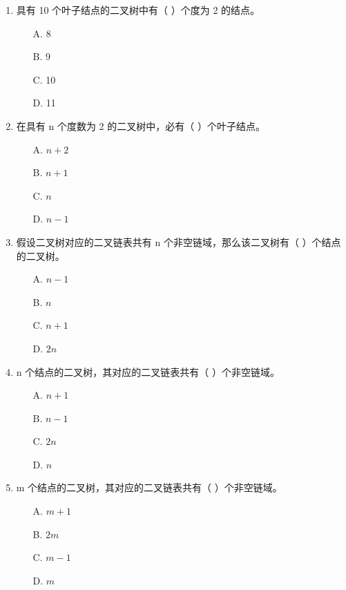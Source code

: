 \documentclass[12pt, a4paper]{article}
\begin{document}
\begin{enumerate}[label=\arabic*.]
	\item 具有 10 个叶子结点的二叉树中有（ ）个度为 2 的结点。
	      \begin{enumerate}
		      \item[A.] 8
		      \item[B.] 9
		      \item[C.] 10
		      \item[D.] 11
	      \end{enumerate}

	\item 在具有 n 个度数为 2 的二叉树中，必有（ ）个叶子结点。
	      \begin{enumerate}
		      \item[A.] $n+2$
		      \item[B.] $n+1$
		      \item[C.] $n$
		      \item[D.] $n-1$
	      \end{enumerate}

	\item 假设二叉树对应的二叉链表共有 n 个非空链域，那么该二叉树有（ ）个结点的二叉树。
	      \begin{enumerate}
		      \item[A.] $n-1$
		      \item[B.] $n$
		      \item[C.] $n+1$
		      \item[D.] $2n$
	      \end{enumerate}

	\item n 个结点的二叉树，其对应的二叉链表共有（ ）个非空链域。
	      \begin{enumerate}
		      \item[A.] $n+1$
		      \item[B.] $n-1$
		      \item[C.] $2n$
		      \item[D.] $n$
	      \end{enumerate}

	\item m 个结点的二叉树，其对应的二叉链表共有（ ）个非空链域。
	      \begin{enumerate}
		      \item[A.] $m+1$
		      \item[B.] $2m$
		      \item[C.] $m-1$
		      \item[D.] $m$
	      \end{enumerate}


\end{enumerate}
\end{document}

